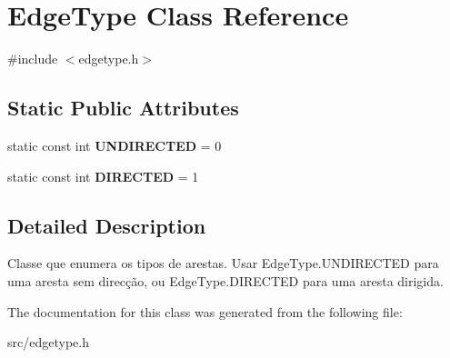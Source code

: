 \hypertarget{class_edge_type}{}\section{Edge\+Type Class Reference}
\label{class_edge_type}


{\ttfamily \#include $<$edgetype.\+h$>$}

\subsection*{Static Public Attributes}
\begin{DoxyCompactItemize}
\item 
\mbox{\label{class_edge_type_a6533cc56d05c288a550b9980b66c9317}} 
static const int {\bfseries U\+N\+D\+I\+R\+E\+C\+T\+ED} = 0
\item 
\mbox{\label{class_edge_type_a903017a534f2818c2d17145e4ae0321c}} 
static const int {\bfseries D\+I\+R\+E\+C\+T\+ED} = 1
\end{DoxyCompactItemize}


\subsection{Detailed Description}
Classe que enumera os tipos de arestas. Usar Edge\+Type.\+U\+N\+D\+I\+R\+E\+C\+T\+ED para uma aresta sem direcção, ou Edge\+Type.\+D\+I\+R\+E\+C\+T\+ED para uma aresta dirigida. 

The documentation for this class was generated from the following file\+:\begin{DoxyCompactItemize}
\item 
src/edgetype.\+h\end{DoxyCompactItemize}
